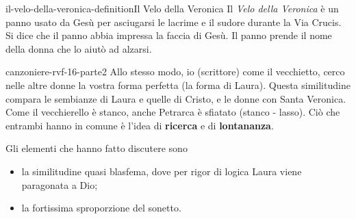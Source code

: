 \documentclass[preview]{standalone}
\begin{document}
\begin{snippetdefinition}{il-velo-della-veronica-definition}{Il Velo della Veronica}
    Il \textit{Velo della Veronica} è un panno usato da Gesù per asciugarsi le lacrime e il sudore
    durante la Via Crucis.
    Si dice che il panno abbia impressa la faccia di Gesù. Il panno prende il nome della donna che lo aiutò ad alzarsi.
\end{snippetdefinition}

\begin{snippet}{canzoniere-rvf-16-parte2}
    Allo stesso modo, io (scrittore) come il vecchietto, cerco nelle altre donne la vostra forma perfetta
    (la forma di Laura).
    Questa similitudine compara le sembianze di Laura e quelle di Cristo, e le donne con Santa Veronica.
    Come il vecchierello è stanco, anche Petrarca è sfiatato (stanco - lasso).
    Ciò che entrambi hanno in comune è l'idea di \textbf{ricerca} e di \textbf{lontananza}.

    Gli elementi che hanno fatto discutere sono
    \begin{itemize}
        \item la similitudine quasi blasfema, dove per rigor di logica Laura viene paragonata a Dio;
        \item la fortissima sproporzione del sonetto.
    \end{itemize}

\end{snippet}
\end{document}
